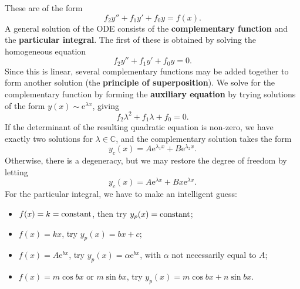 \documentclass[letter-paper]{tufte-book}
\newcommand{\ex}{\mathrm{e}}
\newcommand\Def[1]{\textbf{#1}}
\begin{document}
These are of the form
\begin{equation*}
  f_2 y'' + f_1 y' + f_0 y = f(x).
\end{equation*}
A general solution of the ODE consists of the \Def{complementary function}
and the \Def{particular integral}. The first of these is obtained by
solving the homogeneous equation
\begin{equation*}
  f_2 y'' + f_1 y' + f_0 y = 0.
\end{equation*}
Since this is linear, several complementary functions may be added together to
form another solution (the \Def{principle of superposition}). We solve for
the complementary function by forming the \Def{auxiliary equation} by trying
solutions of the form $y(x)\sim\ex^{\lambda x}$, giving
\begin{equation*}
  f_2 \lambda^2 + f_1 \lambda + f_0 = 0.
\end{equation*}
If the determinant of the resulting quadratic equation is non-zero, we have
exactly two solutions for $\lambda\in\mathbb{C}$, and the complementary solution
takes the form
\begin{equation*}
  y_c(x) = A\ex^{\lambda_1 x} + B\ex^{\lambda_2 x}.
\end{equation*}
Otherwise, there is a degeneracy, but we may restore the degree of freedom by
letting
\begin{equation*}
  y_c(x) = A\ex^{\lambda x} + Bx\ex^{\lambda x}.
\end{equation*}
For the particular integral, we have to make an intelligent guess:
\begin{itemize}
  \item $f(x) = k = \textnormal{constant}$, then try $y_p(x) =
  \textnormal{constant}$;
  \item $f(x) = kx$, try $y_p(x) = bx + c$;
  \item $f(x) = A\ex^{bx}$, try $y_p(x) = \alpha\ex^{bx}$, with $\alpha$ not
  necessarily equal to $A$;
  \item $f(x) = m\cos bx$ or $m\sin bx$, try $y_p(x) = m\cos bx + n\sin bx$.
\end{itemize}
\end{document}
